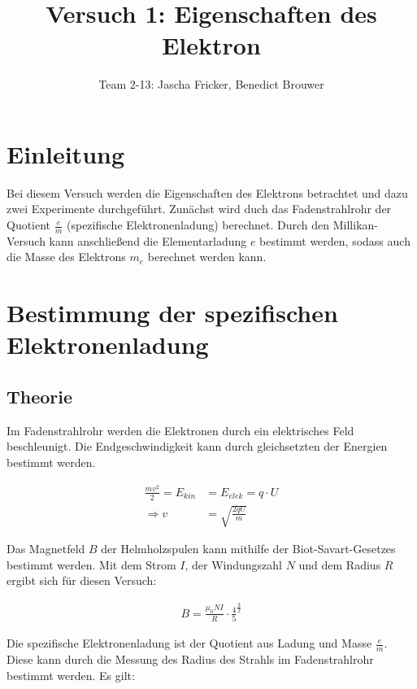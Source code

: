 \documentclass[11pt, a4paper]{article}
\title{Versuch 1: Eigenschaften des Elektron}
\author{Team 2-13: Jascha Fricker, Benedict Brouwer}
\begin{document}
    \maketitle


    \tableofcontents

    \newpage

    \section{Einleitung}

    Bei diesem Versuch werden die Eigenschaften des Elektrons betrachtet und dazu zwei Experimente durchgeführt. Zunächst wird duch das Fadenstrahlrohr
    der Quotient $\frac{e}{m}$ (spezifische Elektronenladung) berechnet. Durch den Millikan-Versuch kann anschließend die Elementarladung $e$ bestimmt
    werden, sodass auch die Masse des Elektrons $m_e$ berechnet werden kann.

    \section{Bestimmung der spezifischen Elektronenladung}

    \subsection{Theorie}

    Im Fadenstrahlrohr werden die Elektronen durch ein elektrisches Feld beschleunigt. Die Endgeschwindigkeit kann durch gleichsetzten der Energien bestimmt werden.

    \begin{align}
    \frac{mv^2}{2} = E_{kin} &= E_{elek} = q \cdot U \label{geschw}\\
    \Rightarrow v &= \sqrt{\frac{2qU}{m}}
    \end{align}
    
    Das Magnetfeld $B$ der Helmholzspulen kann mithilfe der Biot-Savart-Gesetzes bestimmt werden.
    Mit dem Strom $I$, der Windungszahl $N$ und dem Radius $R$ ergibt sich für diesen Versuch:

    \begin{align}
        B = \frac{\mu_0 N I}{R} \cdot \frac{4}{5}^{\frac{3}{2}}
    \end{align}

    Die spezifische Elektronenladung ist der Quotient aus Ladung und Masse $\frac{e}{m}$.
    Diese kann durch die Messung des Radius des Strahls im Fadenstrahlrohr bestimmt werden. Es gilt:
\end{document}
